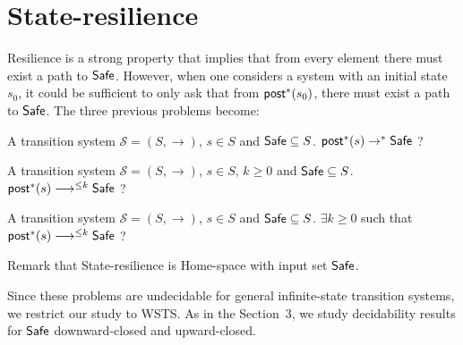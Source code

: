 



\section{State-resilience}


Resilience is a strong property that implies that from every element %
 there must exist a path to $\textsf{Safe}$. However, when one considers a system with an initial state $s_0$, it could be sufficient to only ask that from 
 $
 \textsf{post}^*(s_0)$, there must exist a path to $\textsf{Safe}$. 
%
The three previous problems become:




{A transition system $\mathscr{S}=(S,\rightarrow)$, $s \in S$ and $\textsf{Safe} \subseteq S$.}
{$\textsf{post}^*(s)  \rightarrow^{*} \textsf{Safe} $ ? \newline}

{A transition system $\mathscr{S}=(S,\rightarrow)$, $s \in S$, $k \geq 0$ and $\textsf{Safe} \subseteq S$.}
{ $\post^*(s) \longrightarrow^{\leq k} \Safe$ ?  \newline}

{A transition system $\mathscr{S}=(S,\rightarrow)$, $s \in S$ and $\textsf{Safe} \subseteq S$.}
{$\exists k \geq 0$ such that $\post^*(s) \longrightarrow^{\leq k} \Safe$ ?  \newline}




Remark that {\sc State-resilience} is {\sc Home-space} with input set $\textsf{Safe}$.
\iffalse
\problemx{State resilience problems}
{A transition system $\mathscr{S}=(S,\rightarrow)$, $s \in S$, two sets $\Safe, \Bad \subseteq S$, $k \in \mathbb{N}$.}
{ ({\sc state-resilience problem (SRP)}) $\post^*(s) \longrightarrow^{*} \Safe$ ?\newline  
({\sc $k$-state-resilience problem (kSRP)})		$\post^*(s) \longrightarrow^{\leq k} \Safe$ ?\newline
({\sc bounded-state-resilience problem (BSRP)})	$\exists k \geq 0$ such that $\mathscr{S}$ is 
 $k$-resilient ?\newline}
\fi
Since these problems are undecidable for general infinite-state transition systems, we restrict our study to WSTS.
As in the Section~3, we study decidability results for $\textsf{Safe}$ downward-closed and upward-closed. 


